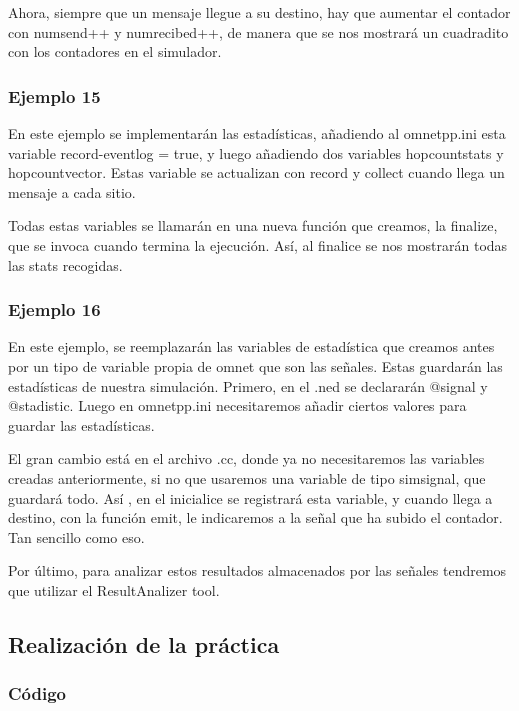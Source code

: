 \documentclass{article}
\begin{document}
		Ahora, siempre que un mensaje llegue a su destino, hay que aumentar el contador con  numsend++ y numrecibed++, de manera que se nos mostrará un cuadradito con los contadores en el simulador.
		
		\subsubsection{Ejemplo 15}
		
		En este ejemplo se implementarán las estadísticas, añadiendo al omnetpp.ini esta variable record-eventlog = true, y luego añadiendo dos variables hopcountstats y hopcountvector. Estas variable se actualizan con record y collect cuando llega un mensaje a cada sitio.
		
		Todas estas variables se llamarán en una nueva función que creamos, la finalize, que se invoca cuando termina la ejecución. Así, al finalice se nos mostrarán todas las stats recogidas.
	
		\subsubsection{Ejemplo 16}
		
		En este ejemplo, se reemplazarán las variables de estadística que creamos antes por un tipo de variable propia de omnet que son las señales. Estas guardarán las estadísticas de nuestra simulación.	Primero, en el .ned se declararán @signal y @stadistic. Luego en omnetpp.ini necesitaremos añadir ciertos valores para guardar las estadísticas.
		
		El gran cambio está en el archivo .cc, donde ya no necesitaremos las variables creadas anteriormente, si no que usaremos una variable de tipo simsignal, que guardará todo. Así , en el inicialice se registrará esta variable, y cuando llega a destino, con la función emit, le indicaremos a la señal que ha subido el contador. Tan sencillo como eso. 
		
		Por último, para analizar estos resultados almacenados por las señales tendremos que utilizar el ResultAnalizer tool.
		
		\newpage
		
		\subsection{Realización de la práctica}
		\subsubsection{Código}
		
\end{document}
